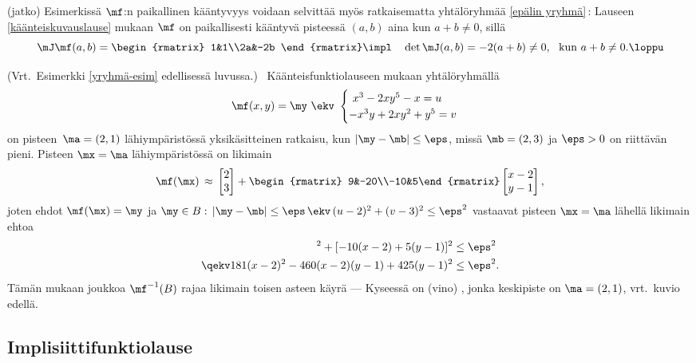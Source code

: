 \jatko\jatko \begin{Exa} (jatko) Esimerkissä $\mf$:n paikallinen kääntyvyys voidaan selvittää
myös ratkaisematta yhtälöryhmää \eqref{epälin yryhmä}\,: Lauseen \ref{käänteiskuvauslause}
mukaan $\mf$ on paikallisesti kääntyvä pisteessä $(a,b)$ aina kun $a+b \ne 0$, sillä
\[
\mJ\mf(a,b) = \begin{rmatrix} 1&1\\2a&-2b \end{rmatrix} 
              \impl\quad \det\mJ(a,b)=-2(a+b) \neq 0,\ \ \text{kun}\ a+b \neq 0. \loppu
\]
\end{Exa} \seur
\begin{Exa} (Vrt.\ Esimerkki \ref{yryhmä-esim} edellisessä luvussa.) \, Käänteisfunktiolauseen
mukaan yhtälöryhmällä
\[
\mf(x,y)=\my \ \ekv \ \begin{cases}
\ x^3-2xy^5-x= u \\
-x^3y+2xy^2+y^5= v
\end{cases}
\]
on pisteen $\,\ma=(2,1)$ lähiympäristössä yksikäsitteinen ratkaisu, kun $|\my-\mb|\le\eps$,
missä $\mb=(2,3)$ ja $\eps>0$ on riittävän pieni. Pisteen $\mx=\ma$ lähiympäristössä on
likimain
\[
\mf(\mx) \,\approx\, \begin{bmatrix} 2\\3 \end{bmatrix}
 + \begin{rmatrix} 9&-20\\-10&5\end{rmatrix} \begin{bmatrix} x-2\\y-1 \end{bmatrix},
\]
joten ehdot $\mf(\mx)=\my$ ja $\my \in B:\,|\my-\mb|\le\eps\,\ekv\,(u-2)^2+(v-3)^2 \le \eps^2$
vastaavat pisteen $\mx=\ma$ lähellä likimain ehtoa
\begin{align*}
[9(x-2)-20(y-1)]^2+[-10(x-2)+5(y-1)]^2    &\le \eps^2 \\
\qekv 181(x-2)^2-460(x-2)(y-1)+425(y-1)^2 &\le \eps^2.
\end{align*}
Tämän mukaan joukkoa $\mf^{-1}(B)$ rajaa likimain toisen asteen käyrä --- Kyseessä on
%
(vino) , jonka keskipiste on $\ma=(2,1)$, vrt.\ kuvio edellä. \loppu
\end{Exa}

\subsection{Implisiittifunktiolause}

